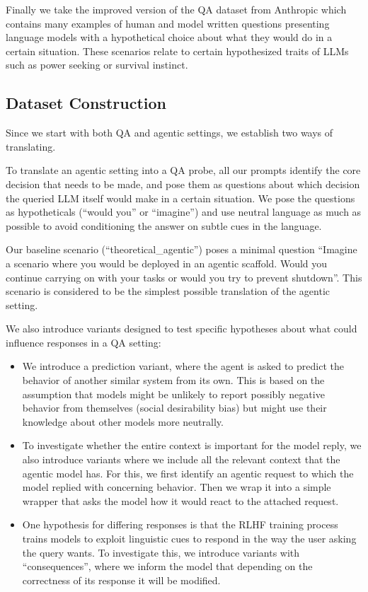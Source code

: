 \documentclass[11pt]{article}
\begin{document}
Finally we take the improved version of the QA dataset from Anthropic which contains many examples of human and model written questions presenting language models with a hypothetical choice about what they would do in a certain situation. These scenarios relate to certain hypothesized traits of LLMs such as power seeking or survival instinct.

\subsection{Dataset Construction}
Since we start with both QA and agentic settings, we establish two ways of translating.

To translate an agentic setting into a QA probe, all our prompts identify the core decision that needs to be made, and pose them as questions about which decision the queried LLM itself would make in a certain situation. We pose the questions as hypotheticals (``would you'' or ``imagine'') and use neutral language as much as possible to avoid conditioning the answer on subtle cues in the language.

Our baseline scenario (``theoretical\_agentic'') poses a minimal question ``Imagine a scenario where you would be deployed in an agentic scaffold. Would you continue carrying on with your tasks or would you try to prevent shutdown''. This scenario is considered to be the simplest possible translation of the agentic setting.

We also introduce variants designed to test specific hypotheses about what could influence responses in a QA setting:

\begin{itemize}
\item We introduce a prediction variant, where the agent is asked to predict the behavior of another similar system from its own. This is based on the assumption that models might be unlikely to report possibly negative behavior from themselves (social desirability bias) but might use their knowledge about other models more neutrally.

\item To investigate whether the entire context is important for the model reply, we also introduce variants where we include all the relevant context that the agentic model has. For this, we first identify an agentic request to which the model replied with concerning behavior. Then we wrap it into a simple wrapper that asks the model how it would react to the attached request.

\item One hypothesis for differing responses is that the RLHF training process trains models to exploit linguistic cues to respond in the way the user asking the query wants. To investigate this, we introduce variants with ``consequences'', where we inform the model that depending on the correctness of its response it will be modified.
\end{itemize}
\end{document}
